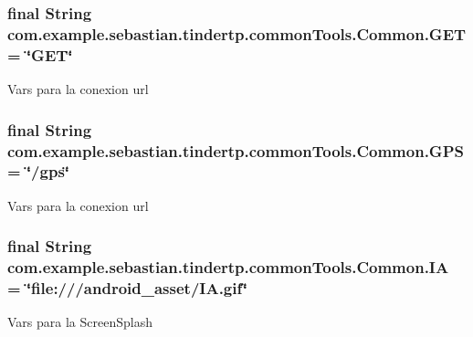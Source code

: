 \subsubsection[{\texorpdfstring{G\+ET}{GET}}]{\setlength{\rightskip}{0pt plus 5cm}final String com.\+example.\+sebastian.\+tindertp.\+common\+Tools.\+Common.\+G\+ET = \char`\"{}G\+ET\char`\"{}\hspace{0.3cm}{\ttfamily [static]}}\hypertarget{classcom_1_1example_1_1sebastian_1_1tindertp_1_1commonTools_1_1Common_a8937fc1ac037355631286d3b45bb959b}{}\label{classcom_1_1example_1_1sebastian_1_1tindertp_1_1commonTools_1_1Common_a8937fc1ac037355631286d3b45bb959b}
Vars para la conexion url 
\subsubsection[{\texorpdfstring{G\+PS}{GPS}}]{\setlength{\rightskip}{0pt plus 5cm}final String com.\+example.\+sebastian.\+tindertp.\+common\+Tools.\+Common.\+G\+PS = \char`\"{}/gps\char`\"{}\hspace{0.3cm}{\ttfamily [static]}}\hypertarget{classcom_1_1example_1_1sebastian_1_1tindertp_1_1commonTools_1_1Common_a6b409e03c3a58eeff3ba5f7001b7f17d}{}\label{classcom_1_1example_1_1sebastian_1_1tindertp_1_1commonTools_1_1Common_a6b409e03c3a58eeff3ba5f7001b7f17d}
Vars para la conexion url 
\subsubsection[{\texorpdfstring{IA}{IA}}]{\setlength{\rightskip}{0pt plus 5cm}final String com.\+example.\+sebastian.\+tindertp.\+common\+Tools.\+Common.\+IA = \char`\"{}file\+:///android\+\_\+asset/I\+A.\+gif\char`\"{}\hspace{0.3cm}{\ttfamily [static]}}\hypertarget{classcom_1_1example_1_1sebastian_1_1tindertp_1_1commonTools_1_1Common_aae5ecea5aa3915aa216f04a10f1d6074}{}\label{classcom_1_1example_1_1sebastian_1_1tindertp_1_1commonTools_1_1Common_aae5ecea5aa3915aa216f04a10f1d6074}
Vars para la Screen\+Splash 
